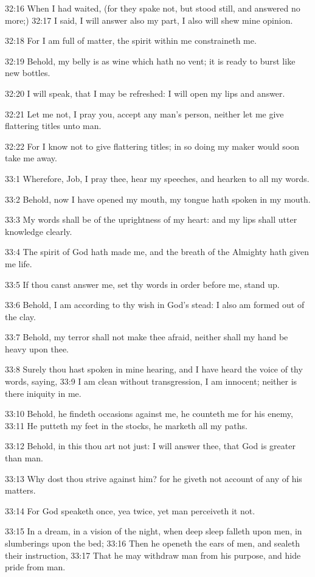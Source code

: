 32:16 When I had waited, (for they spake not, but stood still, and
answered no more;) 32:17 I said, I will answer also my part, I also
will shew mine opinion.

32:18 For I am full of matter, the spirit within me constraineth me.

32:19 Behold, my belly is as wine which hath no vent; it is ready to
burst like new bottles.

32:20 I will speak, that I may be refreshed: I will open my lips and
answer.

32:21 Let me not, I pray you, accept any man's person, neither let me
give flattering titles unto man.

32:22 For I know not to give flattering titles; in so doing my maker
would soon take me away.

33:1 Wherefore, Job, I pray thee, hear my speeches, and hearken to all
my words.

33:2 Behold, now I have opened my mouth, my tongue hath spoken in my
mouth.

33:3 My words shall be of the uprightness of my heart: and my lips
shall utter knowledge clearly.

33:4 The spirit of God hath made me, and the breath of the Almighty
hath given me life.

33:5 If thou canst answer me, set thy words in order before me, stand
up.

33:6 Behold, I am according to thy wish in God's stead: I also am
formed out of the clay.

33:7 Behold, my terror shall not make thee afraid, neither shall my
hand be heavy upon thee.

33:8 Surely thou hast spoken in mine hearing, and I have heard the
voice of thy words, saying, 33:9 I am clean without transgression, I
am innocent; neither is there iniquity in me.

33:10 Behold, he findeth occasions against me, he counteth me for his
enemy, 33:11 He putteth my feet in the stocks, he marketh all my
paths.

33:12 Behold, in this thou art not just: I will answer thee, that God
is greater than man.

33:13 Why dost thou strive against him? for he giveth not account of
any of his matters.

33:14 For God speaketh once, yea twice, yet man perceiveth it not.

33:15 In a dream, in a vision of the night, when deep sleep falleth
upon men, in slumberings upon the bed; 33:16 Then he openeth the ears
of men, and sealeth their instruction, 33:17 That he may withdraw man
from his purpose, and hide pride from man.

